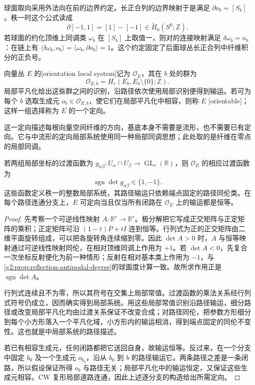 \ProseParagraphBreak

球面取向采用外法向在前的边界约定。长正合列的边界映射于是满足 \(\partial o_b=[S_b]\)。秩一时这个公式读成
\[
	\partial[-1,1]=[1]-[-1]\in\widetilde H_0(S^0;\mathbb Z).
\]
若球面的约化顶维上同调类 \(\omega_b\) 在 \([S_b]\) 上取值一，则对的连接映射满足 \(\delta\omega_b=u_b\)：在链上有 \(\langle\delta\omega_b,o_b\rangle=\langle\omega_b,\partial o_b\rangle=1\)。这个约定固定了后面球丛长正合列中纤维积分的正负号。

\begin{definition}\label{g2:def:bundle-orientation-system}
	向量丛 \(E\) 的[orientation local system]记为 \(\mathcal O_E\)，其在 \(b\) 处的群为
	\[
		\mathcal O_{E,b}=H_r(E_b,E_b\setminus\{0\};\mathbb Z).
	\]
	局部平凡化给出这些群之间的识别，沿路径依次使用局部识别便得到输运。若可为每个 \(b\) 选取生成元 \(o_b\in\mathcal O_{E,b}\)，使它们在局部平凡化中相容，则称 \(E\) [orientable]；这样一组选择称为 \(E\) 的一个定向。
\end{definition}

这一定向描述每根向量空间纤维的方向，基底本身不需要是流形，也不需要已有定向。它与中流形的定向局部系统使用同一种局部同调思想；此处取的是纤维在零点的局部同调。

\begin{proposition}\label{g2:prop:bundle-orientation-transport}
	若两组局部坐标的过渡函数为 \(g_{\alpha\beta}:U_\alpha\cap U_\beta\to\operatorname{GL}_r(\mathbb R)\)，则 \(\mathcal O_E\) 的相应过渡函数为
	\[
		\operatorname{sgn}\det g_{\alpha\beta}\in\{1,-1\}.
	\]
	这些函数定义秩一的整数局部系统，其路径输运只依赖端点固定的路径同伦类。在每个路径连通分支上，\(E\) 可定向当且仅当所有闭路在 \(\mathcal O_E\) 上的输运都是恒等。
\end{proposition}
\begin{proof}
	先考察一个可逆线性映射 \(A:\mathbb R^r\to\mathbb R^r\)。极分解把它写成正交矩阵与正定矩阵的乘积；正定矩阵可沿 \((1-t)P+tI\) 连到恒等。行列式为正的正交矩阵由二维平面旋转组成，可以把各旋转角连续缩到零。因此 \(\det A>0\) 时，\(A\) 与恒等映射通过可逆线性映射同伦，在相对顶维同调上作用为 \(+1\)。若 \(\det A<0\)，先复合一次坐标反射便化为前一种情形；反射在相对基本类上作用为 \(-1\)，与\cref{g2:prop:reflection-antipodal-degree}的球面度计算一致。故所求作用正是 \(\operatorname{sgn}\det A\)。

	行列式连续且不为零，所以其符号在交集上局部常值。过渡函数的乘法关系经行列式符号仍成立，因而确实得到局部系统。用这些局部常值识别沿路径输运，细分路径或改变局部平凡化均由过渡关系保证不改变合成；对路径同伦，把参数方形细分到每个小方形落入一个平凡化域，小方形内的输运相消，得到端点固定的同伦不变性。这也就是中局部系统的路径描述。

	若已有相容生成元，任何闭路都把它送回自身，故输运恒等。反过来，在一个分支中固定 \(b_0\) 及一个生成元 \(o_{b_0}\)，沿从 \(b_0\) 到 \(b\) 的路径输运它。两条路径之差是一条闭路，所以假设保证所得 \(o_b\) 与路径无关；局部平凡化中的输运恒定，又保证这些生成元相容。CW 复形局部道路连通，因此上述逐分支的构造给出所需定向。
\end{proof}

